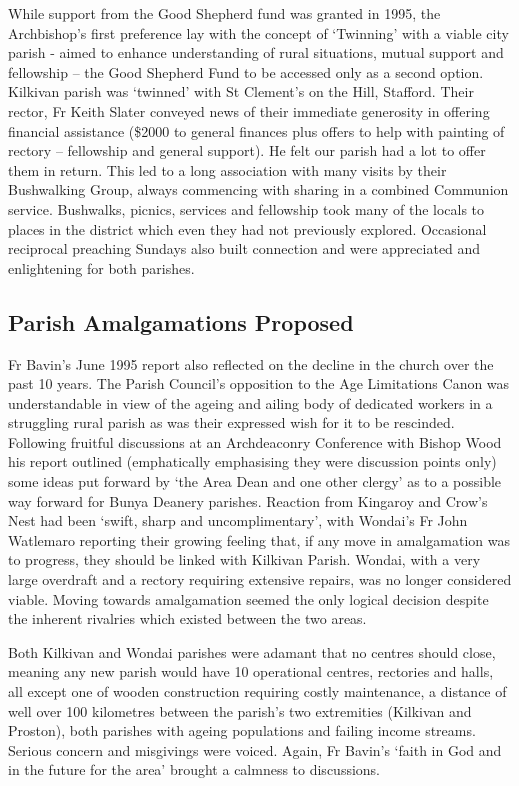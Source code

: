 While support from the Good Shepherd fund was granted in 1995, the Archbishop's first preference lay with the concept of `Twinning' with a viable city parish - aimed to enhance understanding of rural situations, mutual support and fellowship -- the Good Shepherd Fund to be accessed only as a second option. Kilkivan parish was `twinned' with St Clement's on the Hill, Stafford. Their rector, Fr Keith Slater conveyed news of their immediate generosity in offering financial assistance (\$2000 to general finances plus offers to help with painting of rectory -- fellowship and general support). He felt our parish had a lot to offer them in return. This led to a long association with many visits by their Bushwalking Group, always commencing with sharing in a combined Communion service. Bushwalks, picnics, services and fellowship took many of the locals to places in the district which even they had not previously explored. Occasional reciprocal preaching Sundays also built connection and were appreciated and enlightening for both parishes.



\subsection{Parish Amalgamations Proposed}



Fr Bavin's June 1995 report also reflected on the decline in the church over the past 10 years. The Parish Council's opposition to the Age Limitations Canon was understandable in view of the ageing and ailing body of dedicated workers in a struggling rural parish as was their expressed wish for it to be rescinded. Following fruitful discussions at an Archdeaconry Conference with Bishop Wood his report outlined (emphatically emphasising they were discussion points only) some ideas put forward by `the Area Dean and one other clergy' as to a possible way forward for Bunya Deanery parishes. Reaction from Kingaroy and Crow's Nest had been `swift, sharp and uncomplimentary', with Wondai's Fr John Watlemaro reporting their growing feeling that, if any move in amalgamation was to progress, they should be linked with Kilkivan Parish. Wondai, with a very large overdraft and a rectory requiring extensive repairs, was no longer considered viable. Moving towards amalgamation seemed the only logical decision despite the inherent rivalries which existed between the two areas.



Both Kilkivan and Wondai parishes were adamant that no centres should close, meaning any new parish would have 10 operational centres, rectories and halls, all except one of wooden construction requiring costly maintenance, a distance of well over 100 kilometres between the parish's two extremities (Kilkivan and Proston), both parishes with ageing populations and failing income streams. Serious concern and misgivings were voiced. Again, Fr Bavin's `faith in God and in the future for the area' brought a calmness to discussions.



